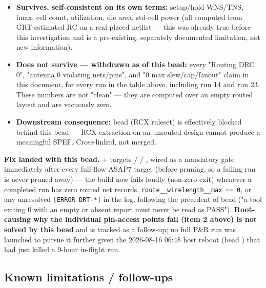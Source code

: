 \begin{record}
\begin{itemize}
\tightlist
\item
  \textbf{Survives, self-consistent on its own terms:}
  setup/\allowbreak{}hold WNS/TNS, fmax, cell count, utilization, die
  area, std-cell power (all computed from GRT-estimated RC on a real
  placed netlist --- this was already true before this investigation and
  is a pre-existing, separately documented limitation, not new
  information).
\item
  \textbf{Does not survive --- withdrawn as of this bead:} every
  "Routing DRC 0", "antenna 0 violating nets/\allowbreak{}pins", and "0
  max slew/\allowbreak{}cap/\allowbreak{}fanout" claim in this document,
  for every run in the table above, including run 14 and run 23. These
  numbers are not "clean" --- they are computed over an empty routed
  layout and are vacuously zero.
\item
  \textbf{Downstream consequence:} bead 
  (RCX ruleset) is effectively blocked behind this bead --- RCX
  extraction on an unrouted design cannot produce a meaningful SPEF.
  Cross-linked, not merged.
\end{itemize}

\textbf{Fix landed with this bead.}
 +  targets
 /  /
, wired as a mandatory gate immediately
after every full-flow ASAP7  target (before
pruning, so a failing run is never pruned away) --- the build now fails
loudly (non-zero exit) whenever a completed run has zero routed net
records,
\texttt{route\_\allowbreak{}\_\allowbreak{}wirelength\_\allowbreak{}\_\allowbreak{}max\ =\allowbreak{}=\allowbreak{}\ 0},
or any unresolved \texttt{[ERROR\ DRT-\allowbreak{}*]} in the
 log, following the precedent of bead
 ("a tool exiting 0 with an empty or absent report must never
be read as PASS"). \textbf{Root-causing why the individual pin-access
points fail (item 2 above) is not solved by this bead} and is tracked as
a follow-up; no full P\&R run was launched to pursue it further given
the 2026-08-16 06:48 host reboot (bead ) that had just killed
a 9-hour in-flight run.

\end{record}

\subsection{Known limitations / follow-ups}\label{cr:run:phase5:known-limitations-follow-ups}

